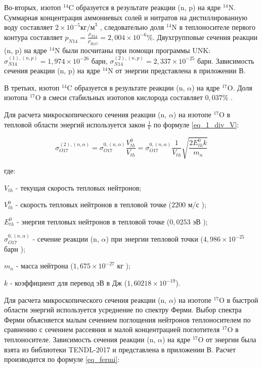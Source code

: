 Во-вторых, изотоп $^{14}\text{C}$ образуется в результате реакции (n, p) на ядре $^{14}\text{N}$. Суммарная концентрация 
аммониевых солей и нитратов на дистиллированную воду составляет $2 \times 10^{-5} \text{кг/м}^{3}$ \cite{gost_water}, 
следовательно доля $^{14}\text{N}$ в теплоносителе первого контура составляет 
$p_{N14} = \frac{\rho_{N14}}{\rho_{H_{2}O}} = 2,004 \times 10^{-6} \%$. Двухгрупповые сечения реакции (n, p) на ядре 
$^{14}\text{N}$ были посчитаны при помощи программы UNK:
$\sigma_{N14}^{(1), (n, p)} = 1,974 \times 10^{-26}$ барн, 
$\sigma_{N14}^{(2), (n, p)} = 2,337 \times 10^{-25}$ барн.
Зависимость сечения реакции (n, p) на ядре $^{14}\text{N}$ от энергии представлена в приложении В.

В третьих, изотоп $^{14}\text{C}$ образуется в результате реакции (n, $\alpha$) на ядре $^{17}\text{O}$. Доля изотопа 
$^{17}\text{O}$ в смеси стабильных изотопов кислорода составляет $0,037 \%$ \cite{hoefs_oxygen_isotopes}.

Для расчета микроскопического сечения реакции (n, $\alpha$) на изотопе $^{17}\text{O}$ в тепловой области энергий 
используется закон $\frac{1}{V}$ по формуле \ref{eq_1_div_V}:

\begin{equation}
    \label{eq_1_div_V}
    \sigma_{O17}^{(2), (n, \alpha)} = \sigma_{O17}^{0, (n, \alpha)} \frac{V_{th}^0}{V_{th}} = 
        \sigma_{O17}^{0, (n, \alpha)} \frac{1}{V_{th}} \sqrt{\frac{2 E_{th}^{0} k}{m_{n}}}
\end{equation}

где:
\begin{description}
    \item ${V_{th}}$ - текущая скорость тепловых нейтронов;
    \item ${V_{th}^{0}}$ - скорость тепловых нейтронов в тепловой точке ($2200$ м/с \cite{kruchkov_tpn});
    \item $E_{th}^{0}$ - энергия тепловых нейтронов в тепловой точке ($0,0253$ эВ \cite{kruchkov_tpn});
    \item $\sigma_{O17}^{0, (n, \alpha)}$ - сечение реакции (n, $\alpha$) при энергии тепловой точки ($4,986 \times 
        10^{-25}$ барн \cite{janis});
    \item $m_{n}$ - масса нейтрона ($1,675 \times 10^{-27}$ кг \cite{kruchkov_tpn});
    \item $k$ - коэффициент для перевод эВ в Дж ($1,60218 \times 10^{-19}$).
\end{description}

Для расчета микроскопического сечения реакции (n, $\alpha$) на изотопе $^{17}\text{O}$ в быстрой области энергий 
используется усреднение по спектру Ферми. Выбор спектра Ферми объясняется малым сечением поглощения нейтронов 
теплоносителем по сравнению с сечением рассеяния и малой концентрацией поглотителя $^{17}\text{O}$ в теплоносителе. 
Зависимость сечения реакции (n, $\alpha$) на ядре $^{17}\text{O}$ от энергии была взята из библиотеки TENDL-2017 
\cite{janis} и представлена в приложении В. Расчет производится по формуле \ref{eq_fermi}:

